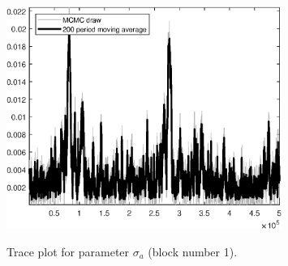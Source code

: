 \begin{figure}[H]
\centering
  \includegraphics[width=0.8\textwidth]{BRS_growth_ext_fd/graphs/TracePlot_sigma_a_blck_1}\\
    \caption{Trace plot for parameter ${\sigma_a}$ (block number 1).}
\end{figure}
